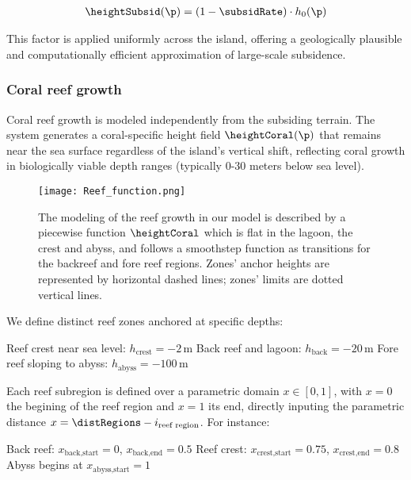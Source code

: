 \documentclass{egpubl}
\begin{document}
\begin{align}
    \heightSubsid(\p) = (1 - \subsidRate) \cdot h_0(\p)
\end{align}

This factor is applied uniformly across the island, offering a geologically plausible and computationally efficient approximation of large-scale subsidence.

\subsubsection{Coral reef growth}
\label{sec:coral-island_reef-growth}

Coral reef growth is modeled independently from the subsiding terrain. The system generates a coral-specific height field $\heightCoral(\p)$ that remains near the sea surface regardless of the island's vertical shift, reflecting coral growth in biologically viable depth ranges (typically 0-30 meters below sea level).

\begin{figure}
    \texttt{[image: Reef\_function.png]}
    \caption{The modeling of the reef growth in our model is described by a piecewise function $\heightCoral$ which is flat in the lagoon, the crest and abyss, and follows a smoothstep function as transitions for the backreef and fore reef regions. Zones' anchor heights are represented by horizontal dashed lines; zones' limits are dotted vertical lines. }
    \label{fig:coral-island_reef-function}
\end{figure}

We define distinct reef zones anchored at specific depths:
\begin{Itemize}
    \Item{} Reef crest near sea level: $h_\text{crest} = -2$\,m
    \Item{} Back reef and lagoon: $h_\text{back} = -20$\,m
    \Item{} Fore reef sloping to abyss: $h_\text{abyss} = -100$\,m
\end{Itemize}

Each reef subregion is defined over a parametric domain $x \in [0, 1]$, with $x=0$ the begining of the reef region and $x=1$ its end, directly inputing the parametric distance $x = \distRegions - i_{\text{reef region}}$. For instance:
\begin{Itemize}
    \Item{} Back reef: $x_{\text{back,start}} = 0$, $x_{\text{back,end}} = 0.5$
    \Item{} Reef crest: $x_{\text{crest,start}} = 0.75$, $x_{\text{crest,end}} = 0.8$
    \Item{} Abyss begins at $x_{\text{abyss,start}} = 1$
\end{Itemize}
\end{document}
